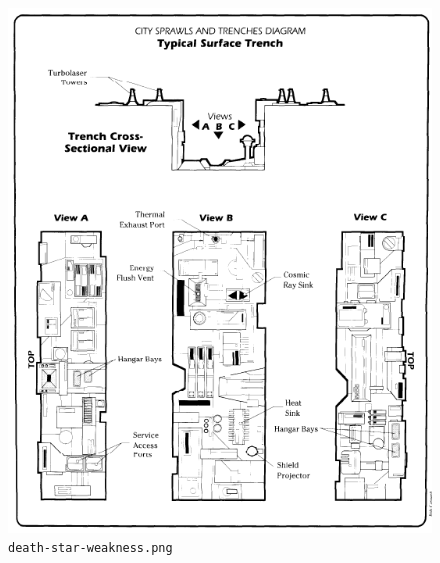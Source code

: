 \documentclass{article}
\begin{document}
\begin{appendices}
\begin{figure}[H]
	\includegraphics[width=\linewidth]{resources/plans/death-star-weakness.png}
	\caption{\texttt{death-star-weakness.png}}
	\label{fig:death_star_weakness}
\end{figure}


\end{appendices}
\end{document}
